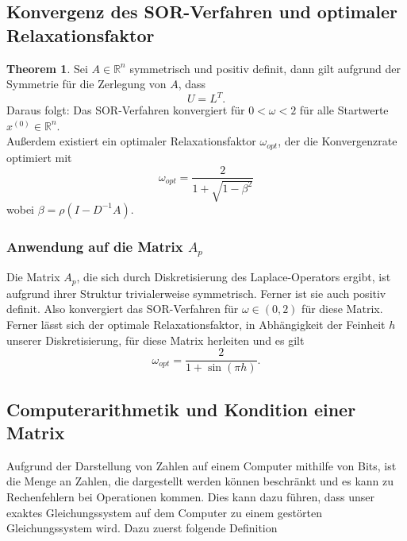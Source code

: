 \documentclass{scrartcl}
\theoremstyle{definition}
\newtheorem{theorem}{Theorem}
\begin{document}
\subsection{Konvergenz des SOR-Verfahren und optimaler Relaxationsfaktor}
\begin{theorem}
    Sei \(A \in \mathbb{R}^n\) symmetrisch und positiv definit, dann gilt aufgrund der Symmetrie
    für die Zerlegung von \(A\), dass
    \[U = L^T.\]
    Daraus folgt: Das SOR-Verfahren konvergiert für \(0 < \omega < 2\) für alle
    Startwerte \(x^{(0)} \in \mathbb{R}^n\). \\
    Außerdem existiert ein optimaler Relaxationsfaktor \(\omega_{opt}\), der die Konvergenzrate optimiert mit
    \[\omega_{opt}=\frac{2}{1+\sqrt{1-\beta^2}}\]
    wobei \(\beta=\rho(I-D^{-1}A)\)\cite[p.~4]{omega_opt}.
\end{theorem}


\subsubsection{Anwendung auf die Matrix \(A_{p}\)}
Die Matrix \(A_p\), die sich durch Diskretisierung des Laplace-Operators ergibt, ist aufgrund ihrer Struktur trivialerweise symmetrisch. Ferner ist sie auch positiv definit\cite[p.~11]{PosDef}.
Also konvergiert das SOR-Verfahren für \(\omega \in (0, 2)\) für diese Matrix.
\\
Ferner lässt sich der optimale Relaxationsfaktor, in Abhängigkeit der Feinheit \(h\) unserer Diskretisierung, für diese Matrix herleiten und es gilt \cite{omega_opt}
\[\omega_{opt}=\frac{2}{1+\sin(\pi h)}.\] 


\subsection{Computerarithmetik und Kondition einer Matrix}
Aufgrund der Darstellung von Zahlen auf einem Computer mithilfe von Bits, ist die Menge an Zahlen, die dargestellt werden können beschränkt und es kann zu Rechenfehlern bei Operationen kommen.
Dies kann dazu führen, dass unser exaktes Gleichungssystem auf dem Computer zu einem gestörten
Gleichungssystem wird.
Dazu zuerst folgende Definition
\end{document}
